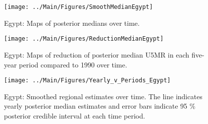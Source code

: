 \documentclass[12pt]{article}\usepackage[]{graphicx}\usepackage[]{color}
\newenvironment{knitrout}{}{} %
\begin{document}
\begin{knitrout}
\color{fgcolor}\begin{figure}[bht]

{\centering \texttt{[image: ../Main/Figures/SmoothMedianEgypt]} 

}

\caption[Egypt]{Egypt: Maps of posterior medians over time.}\label{fig:unnamed-chunk-104}
\end{figure}


\end{knitrout}
\begin{knitrout}
\color{fgcolor}\begin{figure}[bht]

{\centering \texttt{[image: ../Main/Figures/ReductionMedianEgypt]} 

}

\caption[Egypt]{Egypt: Maps of reduction of posterior median U5MR in each five-year period compared to 1990 over time.}\label{fig:unnamed-chunk-105}
\end{figure}


\end{knitrout}
\begin{knitrout}
\color{fgcolor}\begin{figure}[bht]

{\centering \texttt{[image: ../Main/Figures/Yearly\_v\_Periods\_Egypt]} 

}

\caption[Egypt]{Egypt: Smoothed regional estimates over time. The line indicates yearly posterior median estimates and error bars indicate 95 \% posterior credible interval at each time period.}\label{fig:unnamed-chunk-106}
\end{figure}


\end{knitrout}
\end{document}
